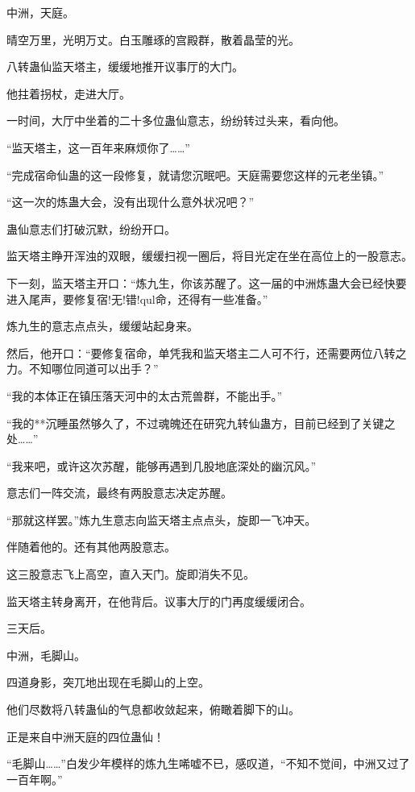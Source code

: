 
\begin{this_body}

中洲，天庭。

晴空万里，光明万丈。白玉雕琢的宫殿群，散着晶莹的光。

八转蛊仙监天塔主，缓缓地推开议事厅的大门。

他拄着拐杖，走进大厅。

一时间，大厅中坐着的二十多位蛊仙意志，纷纷转过头来，看向他。

“监天塔主，这一百年来麻烦你了……”

“完成宿命仙蛊的这一段修复，就请您沉眠吧。天庭需要您这样的元老坐镇。”

“这一次的炼蛊大会，没有出现什么意外状况吧？”

蛊仙意志们打破沉默，纷纷开口。

监天塔主睁开浑浊的双眼，缓缓扫视一圈后，将目光定在坐在高位上的一股意志。

下一刻，监天塔主开口：“炼九生，你该苏醒了。这一届的中洲炼蛊大会已经快要进入尾声，要修复宿!无!错!qul命，还得有一些准备。”

炼九生的意志点点头，缓缓站起身来。

然后，他开口：“要修复宿命，单凭我和监天塔主二人可不行，还需要两位八转之力。不知哪位同道可以出手？”

“我的本体正在镇压落天河中的太古荒兽群，不能出手。”

“我的**沉睡虽然够久了，不过魂魄还在研究九转仙蛊方，目前已经到了关键之处……”

“我来吧，或许这次苏醒，能够再遇到几股地底深处的幽沉风。”

意志们一阵交流，最终有两股意志决定苏醒。

“那就这样罢。”炼九生意志向监天塔主点点头，旋即一飞冲天。

伴随着他的。还有其他两股意志。

这三股意志飞上高空，直入天门。旋即消失不见。

监天塔主转身离开，在他背后。议事大厅的门再度缓缓闭合。

三天后。

中洲，毛脚山。

四道身影，突兀地出现在毛脚山的上空。

他们尽数将八转蛊仙的气息都收敛起来，俯瞰着脚下的山。

正是来自中洲天庭的四位蛊仙！

“毛脚山……”白发少年模样的炼九生唏嘘不已，感叹道，“不知不觉间，中洲又过了一百年啊。”


\end{this_body}
